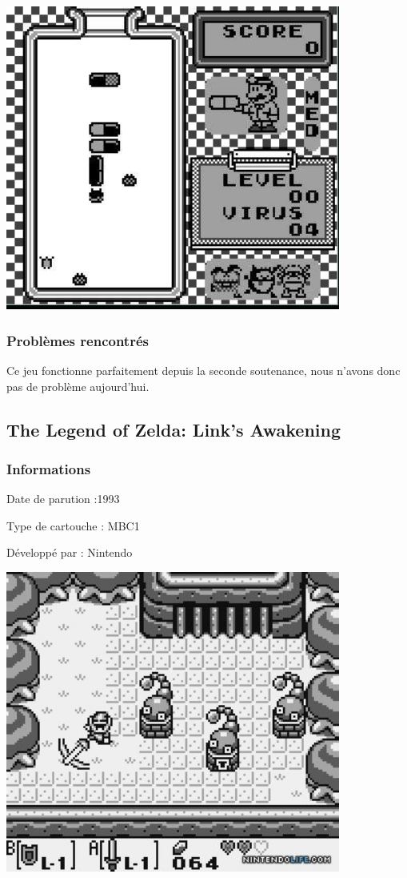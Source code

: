 \documentclass[12pt, a4paper]{article}
\begin{document}
\bigskip
\begin{center}
\includegraphics[width=11cm]{drmario.jpg}
\end{center}

\subsubsection{Problèmes rencontrés}
Ce jeu fonctionne parfaitement depuis la seconde soutenance, nous n'avons donc pas de problème aujourd'hui.

\pagebreak
\subsection{The Legend of Zelda: Link's Awakening}

\subsubsection{Informations}
Date de parution :1993

Type de cartouche : MBC1

Développé par : Nintendo

\bigskip
\begin{center}
\includegraphics[width=11cm]{zelda.jpg}
\end{center}
\end{document}
